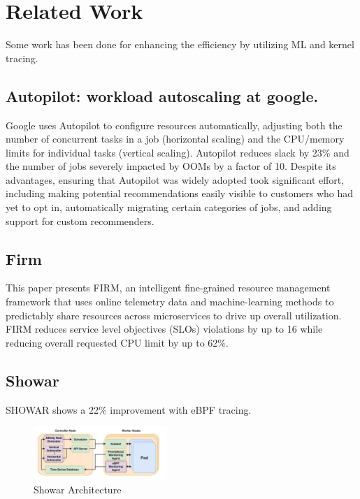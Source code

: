 \documentclass[conference]{IEEEtran}
\begin{document}
\section{Related Work}

Some work has been done for enhancing the efficiency by utilizing ML and kernel tracing.

\subsection{Autopilot: workload autoscaling at google.\cite{b5}}

Google uses Autopilot to configure resources automatically, adjusting both the number of concurrent tasks in a job (horizontal scaling) and the CPU/memory limits for individual tasks (vertical scaling). Autopilot reduces slack by 23\% and the number of jobs severely impacted by OOMs by a factor of 10. Despite its advantages, ensuring that Autopilot was widely adopted took significant effort, including making potential recommendations easily visible to customers who had yet to opt in, automatically migrating certain categories of jobs, and adding support for custom recommenders.

\subsection{Firm}
This paper presents FIRM, an intelligent fine-grained resource management framework that uses online telemetry data and machine-learning methods to predictably share resources across microservices to drive up overall utilization. FIRM reduces service level objectives (SLOs) violations by up to 16 while reducing overall requested CPU limit by up to 62\%.

\subsection{Showar\cite{bShowar}}
SHOWAR shows a 22\% improvement with eBPF tracing.

\begin{figure}[!ht]
    \begin{center}
        \includegraphics[width=0.45\textwidth]{figures/showar.png}
    \end{center}
    \caption{Showar Architecture}
    \label{fig:showar}
\end{figure}
\end{document}
